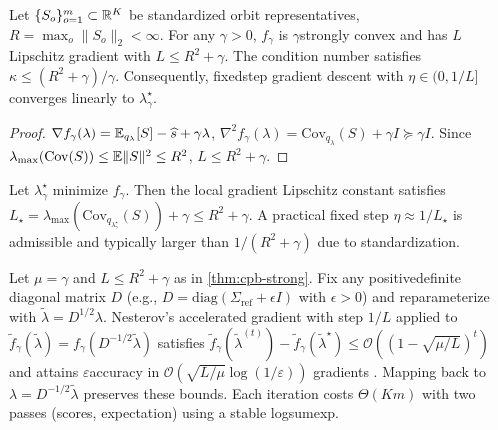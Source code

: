 \begin{theorem}\label{thm:cpb-strong}
Let $\{S_o\}_{o=1}^m\subset\mathbb{R}^K$ be standardized orbit representatives, $R=\max_o \|S_o\|_2<\infty$. For any $\gamma>0$, $f_\gamma$ is $\gamma$\textendash strongly convex and has $L$\textendash Lipschitz gradient with $L \le R^2+\gamma$. The condition number satisfies $\kappa\le (R^2+\gamma)/\gamma$. Consequently, fixed\textendash step gradient descent with $\eta\in(0,1/L]$ converges linearly to $\lambda^\star_\gamma$.
\end{theorem}
\begin{proof}
$\nabla f_\gamma(\lambda)=\mathbb{E}_{q_\lambda}[S]-\widehat s+\gamma\lambda$, $\nabla^2 f_\gamma(\lambda)=\mathrm{Cov}_{q_\lambda}(S)+\gamma I\succeq \gamma I$. Since $\lambda_{\max}(\mathrm{Cov}(S))\le \mathbb{E}\|S\|^2\le R^2$, $L\le R^2+\gamma$.
\end{proof}

\begin{corollary}\label{cor:local-L}
Let $\lambda^\star_\gamma$ minimize $f_\gamma$. Then the local gradient Lipschitz constant satisfies $L_\star=\lambda_{\max}(\mathrm{Cov}_{q_{\lambda^\star_\gamma}}(S))+\gamma\le R^2+\gamma$. A practical fixed step $\eta\approx 1/L_\star$ is admissible and typically larger than $1/(R^2+\gamma)$ due to standardization.
\end{corollary}

\begin{proposition}\label{prop:accel}
Let $\mu=\gamma$ and $L\le R^2+\gamma$ as in \cref{thm:cpb-strong}. Fix any positive\textendash definite diagonal matrix $D$ (e.g., $D=\mathrm{diag}(\Sigma_{\mathrm{ref}}+\epsilon I)$ with $\epsilon>0$) and reparameterize with $\tilde\lambda=D^{1/2}\lambda$. Nesterov's accelerated gradient with step $1/L$ applied to $\tilde f_\gamma(\tilde\lambda)=f_\gamma(D^{-1/2}\tilde\lambda)$ satisfies $\tilde f_\gamma(\tilde\lambda^{(t)})-\tilde f_\gamma(\tilde\lambda^\star)\le \mathcal{O}\!\left((1-\sqrt{\mu/L})^{t}\right)$ and attains $\varepsilon$\textendash accuracy in $\mathcal{O}\!\left(\sqrt{L/\mu}\log(1/\varepsilon)\right)$ gradients \cite{nesterov2004introductory}. Mapping back to $\lambda=D^{-1/2}\tilde\lambda$ preserves these bounds. Each iteration costs $\Theta(Km)$ with two passes (scores, expectation) using a stable log\textendash sum\textendash exp.
\end{proposition}

